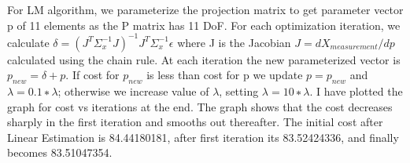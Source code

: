 \documentclass[11pt]{article}
\begin{document}
For LM algorithm, we parameterize the projection matrix to get parameter
vector p of 11 elements as the P matrix has 11 DoF. For each
optimization iteration, we calculate
\(\delta = (J^T\Sigma_{x}^{-1}J)^{-1}J^T\Sigma_{x}^{-1}\epsilon\) where
J is the Jacobian \(J = dX_{measurement}/dp\) calculated using the chain
rule. At each iteration the new parameterized vector is
\(p_{new} = \delta + p\). If cost for \(p_{new}\) is less than cost for
p we update \(p = p_{new}\) and \(\lambda = 0.1 ∗ \lambda\); otherwise
we increase value of \(\lambda\), setting \(\lambda = 10 ∗ \lambda\). I
have plotted the graph for cost vs iterations at the end. The graph
shows that the cost decreases sharply in the first iteration and smooths
out thereafter. The initial cost after Linear Estimation is 84.44180181,
after first iteration its 83.52424336, and finally becomes 83.51047354.
\end{document}
